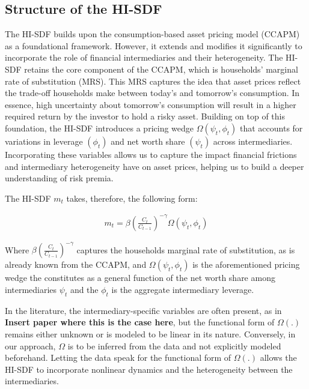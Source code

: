 \documentclass[12pt,a4paper]{article}
\begin{document}
	\subsection{Structure of the HI-SDF}
	
	The HI-SDF builds upon the consumption-based asset pricing model (CCAPM) as a foundational framework. However, it extends and modifies it significantly to incorporate the role of financial intermediaries and their heterogeneity. The HI-SDF retains the core component of the CCAPM, which is households' marginal rate of substitution (MRS). 
	This MRS captures the idea that asset prices reflect the trade-off households make between today's and tomorrow's consumption. In essence, high uncertainty about tomorrow's consumption will result in a higher required return by the investor to hold a risky asset.
	Building on top of this foundation, the HI-SDF introduces a pricing wedge $\Omega(\psi_t, \phi_t)$ that accounts for variations in leverage $(\phi_t)$ and net worth share $(\psi_t)$ across intermediaries. Incorporating these variables allows us to capture the impact financial frictions and intermediary heterogeneity have on asset prices, helping us to build a deeper understanding of risk premia.
	
	The HI-SDF $m_t$ takes, therefore, the following form:
	
	\begin{align}
		m_t = \beta \left( \frac{C_t}{C_{t-1}} \right)^{-\gamma} \Omega(\psi_t, \phi_t)
		\label{m_t}
	\end{align}
	
	
	Where $ \beta \left( \frac{C_t}{C_{t-1}} \right)^{-\gamma} $ captures the households marginal rate of substitution, as is already known from the CCAPM, and $ \Omega(\psi_t, \phi_t) $ is the aforementioned pricing wedge the constitutes as a general function of the net worth share among intermediaries $\psi_t$ and the $\phi_t$ is the aggregate intermediary leverage. 
	
	
	In the literature, the intermediary-specific variables are often present, as in \textbf{Insert paper where this is the case here}, but the functional form of $ \Omega(.) $ remains either unknown or is modeled to be linear in its nature.
	Conversely, in our approach, $ \Omega $ is to be inferred from the data and not explicitly modeled beforehand. Letting the data speak for the functional form of $\Omega(.)$ allows the HI-SDF to incorporate nonlinear dynamics and the heterogeneity between the intermediaries.
	
\end{document}
